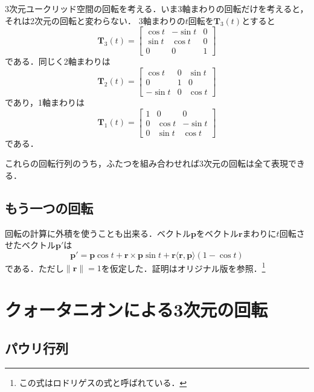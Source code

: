 \documentclass{jsbook}
\newcommand{\bvec}[1]{\boldsymbol{#1}}
\newcommand{\bop}[1]{\boldsymbol{#1}}
\newcommand{\norm}[1]{\|{#1}\|}
\begin{document}
3次元ユークリッド空間の回転を考える．いま3軸まわりの回転だけを考えると，それは2次元の回転と変わらない．
3軸まわりの$t$回転を$\bop{T}_3(t)$とすると
\begin{equation}
\bop{T}_3(t)=\begin{bmatrix}\cos t&-\sin t&0\\\sin t&\cos t&0\\0&0&1\end{bmatrix}
\end{equation}
である．同じく2軸まわりは
\begin{equation}
\bop{T}_2(t)=\begin{bmatrix}\cos t&0&\sin t\\0&1&0\\-\sin t&0&\cos t\end{bmatrix}
\end{equation}
であり，1軸まわりは
\begin{equation}
\bop{T}_1(t)=\begin{bmatrix}1&0&0\\0&\cos t&-\sin t\\0&\sin t&\cos t\end{bmatrix}
\end{equation}
である．

これらの回転行列のうち，ふたつを組み合わせれば3次元の回転は全て表現できる．

\subsection{もう一つの回転}

回転の計算に外積を使うことも出来る．ベクトル$\bvec{p}$をベクトル$\bvec{r}$まわりに$t$回転させたベクトル$\bvec{p}'$は
\begin{equation}
\bvec{p}'=\bvec{p}\cos t+\bvec{r}\times\bvec{p}\sin t+\bvec{r}\langle\bvec{r},\bvec{p}\rangle(1-\cos t)
\end{equation}
である．ただし$\norm{\bvec{r}}=1$を仮定した．証明はオリジナル版を参照．\footnote{この式はロドリゲスの式と呼ばれている．}

\section{クォータニオンによる3次元の回転}

\subsection{パウリ行列}
\end{document}
